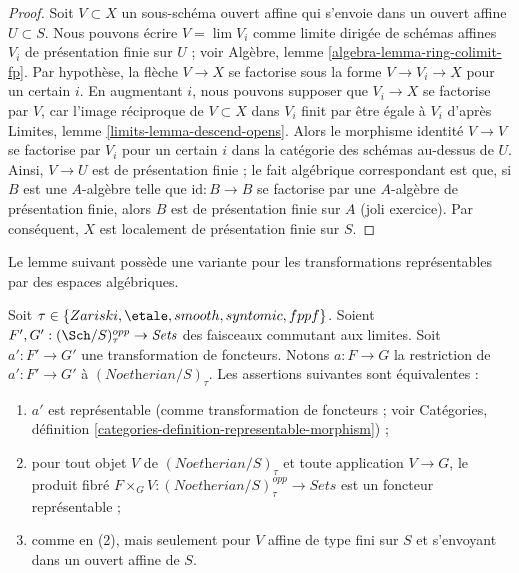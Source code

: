 \begin{proof}
Soit $V \subset X$ un sous-schéma ouvert affine qui s'envoie dans un ouvert
affine $U \subset S$. Nous pouvons écrire $V = \lim V_i$ comme limite dirigée
de schémas affines $V_i$ de présentation finie sur $U$ ; voir Algèbre, lemme
\ref{algebra-lemma-ring-colimit-fp}. Par hypothèse, la flèche $V \to X$ se
factorise sous la forme $V \to V_i \to X$ pour un certain $i$. En augmentant
$i$, nous pouvons supposer que $V_i \to X$ se factorise par $V$, car l'image
réciproque de $V \subset X$ dans $V_i$ finit par être égale à $V_i$ d'après
Limites, lemme \ref{limits-lemma-descend-opens}. Alors le morphisme identité
$V \to V$ se factorise par $V_i$ pour un certain $i$ dans la catégorie des
schémas au-dessus de $U$. Ainsi, $V \to U$ est de présentation finie ; le fait
algébrique correspondant est que, si $B$ est une $A$-algèbre telle que
$\text{id} : B \to B$ se factorise par une $A$-algèbre de présentation finie,
alors $B$ est de présentation finie sur $A$ (joli exercice). Par conséquent,
$X$ est localement de présentation finie sur $S$.
\end{proof}

\noindent
Le lemme suivant possède une variante pour les transformations représentables
par des espaces algébriques.

\begin{lemma}
\label{lemma-representable}
Soit $\tau \in \{Zariski, \etale, smooth, syntomic, fppf\}$. Soient
$F', G' : (\Sch/S)_\tau^{opp} \to \textit{Sets}$ des faisceaux commutant aux
limites. Soit $a' : F' \to G'$ une transformation de foncteurs. Notons
$a : F \to G$ la restriction de $a' : F' \to G'$ à
$(\textit{Noetherian}/S)_\tau$. Les assertions suivantes sont équivalentes :
\begin{enumerate}
\item $a'$ est représentable (comme transformation de foncteurs ; voir
Catégories, définition \ref{categories-definition-representable-morphism}) ;
\item pour tout objet $V$ de $(\textit{Noetherian}/S)_\tau$ et toute
application $V \to G$, le produit fibré
$F \times_G V : (\textit{Noetherian}/S)_\tau^{opp} \to \textit{Sets}$
est un foncteur représentable ;
\item comme en (2), mais seulement pour $V$ affine de type fini sur $S$ et
s'envoyant dans un ouvert affine de $S$.
\end{enumerate}
\end{lemma}

